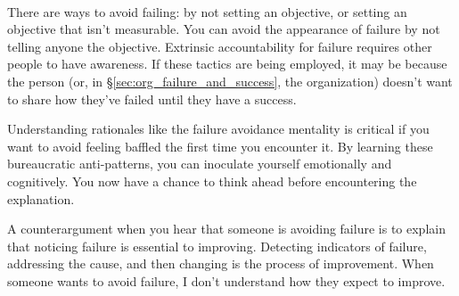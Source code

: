 \ \\

There are ways to avoid failing: by not setting an objective, or setting an objective that isn't measurable. You can avoid the appearance of failure by not telling anyone the objective. Extrinsic accountability for failure requires other people to have awareness. If these tactics are being employed, it may be because the person (or, in \S\ref{sec:org_failure_and_success}, the organization) doesn't want to share how they've failed until they have a success. 

Understanding rationales like the failure avoidance mentality is critical if you want to avoid feeling baffled the first time you encounter it. By learning these bureaucratic anti-patterns, you can inoculate yourself emotionally and cognitively. You now have a chance to think ahead before encountering the explanation.

A counterargument when you hear that someone is avoiding failure is to explain that noticing failure is essential to improving. Detecting indicators of failure, addressing the cause, and then changing is the process of improvement. When someone wants to avoid failure, I don't understand how they expect to improve. 

